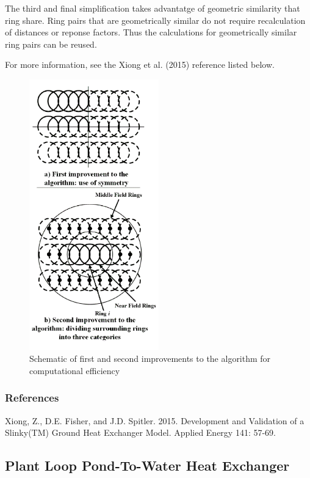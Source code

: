 The third and final simplification takes advantatge of geometric similarity that ring share. Ring pairs that are geometrically similar do not require recalculation of distances or reponse factors. Thus the calculations for geometrically similar ring pairs can be reused.

For more information, see the Xiong et al. (2015) reference listed below.

\begin{figure}[htbp]
\centering
\includegraphics[width=0.5\textwidth]{media/image8001.png}
\caption{Schematic of first and second improvements to the algorithm for computational efficiency \protect \label{fig:slinky-first-and-second-improvements}}
\end{figure}

\subsubsection{References}\label{references-3-003}

Xiong, Z., D.E. Fisher, and J.D. Spitler. 2015. Development and Validation of a Slinky(TM) Ground Heat Exchanger Model. Applied Energy 141: 57-69.

\subsection{Plant Loop Pond-To-Water Heat Exchanger}\label{plant-loop-pond-to-water-heat-exchanger}

